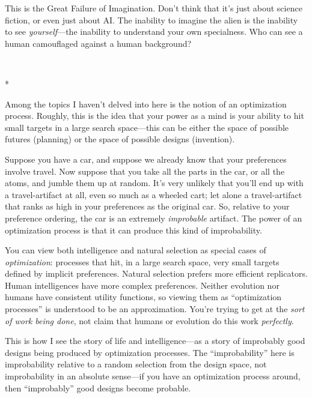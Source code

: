{
 This is the Great Failure of Imagination. Don't
think that it's just about science fiction, or even
just about AI. The inability to imagine the alien is the inability to
see \textit{yourself}{}---the inability to understand your own
specialness. Who can see a human camouflaged against a human
background?}

{\centering
 \ ~
\par}

{\centering
 *
\par}


{
 Among the topics I haven't delved into here is the
notion of an optimization process. Roughly, this is the idea that your
power as a mind is your ability to hit small targets in a large search
space---this can be either the space of possible futures (planning) or
the space of possible designs (invention).}

{
 Suppose you have a car, and suppose we already know that your
preferences involve travel. Now suppose that you take all the parts in
the car, or all the atoms, and jumble them up at random.
It's very unlikely that you'll end up
with a travel-artifact at all, even so much as a wheeled cart; let
alone a travel-artifact that ranks as high in your preferences as the
original car. So, relative to your preference ordering, the car is an
extremely \textit{improbable} artifact. The power of an optimization
process is that it can produce this kind of improbability.}

{
 You can view both intelligence and natural selection as special
cases of \textit{optimization}: processes that hit, in a large search
space, very small targets defined by implicit preferences. Natural
selection prefers more efficient replicators. Human intelligences have
more complex preferences. Neither evolution nor humans have consistent
utility functions, so viewing them as ``optimization
processes'' is understood to be an approximation.
You're trying to get at the \textit{sort of work being
done}, not claim that humans or evolution do this work
\textit{perfectly}.}

{
 This is how I see the story of life and intelligence---as a story
of improbably good designs being produced by optimization processes.
The ``improbability'' here is
improbability relative to a random selection from the design space, not
improbability in an absolute sense---if you have an optimization
process around, then ``improbably''
good designs become probable.}


